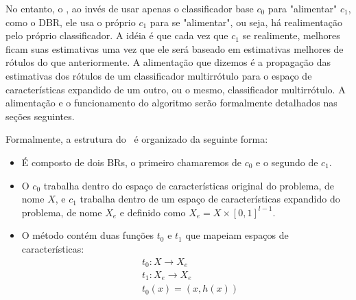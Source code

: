 No entanto, o \MRLMa, ao invés de usar apenas o classificador base $c_0$ para "alimentar" $c_1$, como o DBR,
ele usa o próprio $c_1$ para se "alimentar", ou seja, há realimentação pelo próprio classificador.
A idéia é que cada vez que $c_1$ se realimente, melhores ficam suas estimativas uma vez que ele será baseado
em estimativas melhores de rótulos do que anteriormente. 
A alimentação que dizemos é a propagação das 
estimativas dos rótulos de um classificador multirrótulo para o espaço de características expandido de um outro, ou o mesmo,
classificador multirrótulo. A alimentação e o funcionamento do algoritmo serão formalmente detalhados nas seções seguintes.

Formalmente, a estrutura do \MRLMa~é organizado da seguinte forma:
\begin{itemize}
  \item É composto de dois BRs, o primeiro chamaremos de $c_0$ e o segundo de $c_1$.
  \item O $c_0$ trabalha dentro do espaço de características original do problema, de nome $X$,
  e $c_1$ trabalha dentro de um espaço de características expandido do problema, de nome $X_e$ e
   definido como $X_e=X \times [0,1]^{l-1}$.
  \item O método contém duas funções $t_0$ e $t_1$ que mapeiam espaços de características:
   \begin{equation}
 \begin{split}
    & t_0 : X \rightarrow X_e \\
    & t_1 : X_e \rightarrow X_e \\
    & t_0(x)=(x,h(x))
  \end{split}
 \end{equation}
  
\end{itemize}

%  
 
